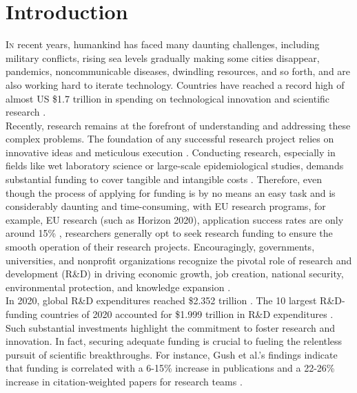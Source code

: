 \chapter{Introduction}
\linenumbers 
\lettrine[lines=1]{I}{n}
recent years, humankind has faced many daunting challenges, including  military conflicts, rising sea levels gradually making some cities disappear, pandemics, noncommunicable diseases, dwindling resources, and so forth, and are also working hard to iterate technology. Countries have reached a record high of almost US \$1.7 trillion in spending on technological innovation and scientific research \citep{RN16}. \\


Recently, research remains at the forefront of understanding and addressing these complex problems. The foundation of any successful research project relies on innovative ideas and meticulous execution \citep{neema2021research}. Conducting research, especially in fields like wet laboratory science or large-scale epidemiological studies, demands substantial funding to cover tangible and intangible costs \citep{schembri2018wasp}. Therefore, even though the process of applying for funding is by no means an easy task and is considerably daunting and time-consuming, with EU research programs, for example, EU research (such as Horizon 2020), application success rates are only around 15\% \citep{schembri2018wasp}, researchers generally opt to seek research funding to ensure the smooth operation of their research projects. Encouragingly, governments, universities, and nonprofit organizations recognize the pivotal role of research and development (R\&D) in driving economic growth, job creation, national security, environmental protection, and knowledge expansion \citep{sargent2017global}. \\

In 2020, global R\&D expenditures reached \$2.352 trillion \citep{sargent2017global}. The 10 largest R\&D-funding countries of 2020 accounted for \$1.999 trillion in R\&D expenditures \citep{sargent2017global}. Such substantial investments highlight the commitment to foster research and innovation. In fact, securing adequate funding is crucial to fueling the relentless pursuit of scientific breakthroughs. For instance, Gush et al.'s findings indicate that funding is correlated with a 6-15\% increase in publications and a 22-26\% increase in citation-weighted papers for research teams \citep{gush2018effect}.\\


